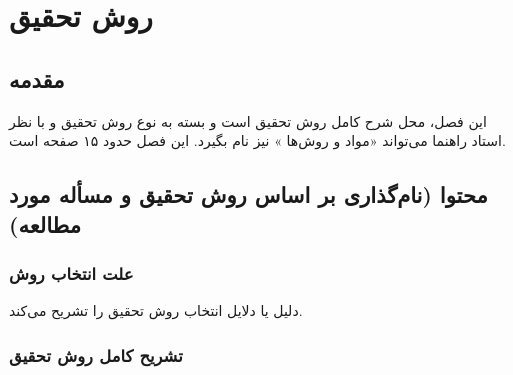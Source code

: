 \chapter{روش تحقیق}
\thispagestyle{empty} 
\section{مقدمه} 
این فصل، محل شرح كامل روش تحقيق است و بسته به نوع روش تحقيق و با نظر استاد راهنما می‌تواند «مواد و روش‌ها%
»
نیز نام بگیرد. اين فصل حدود ۱۵ صفحه است.

\section{محتوا (نام‌گذاری بر اساس روش تحقیق و مسأله مورد مطالعه)}
\subsection{علت انتخاب روش}
دلیل یا دلایل انتخاب روش تحقیق را تشریح می‌کند.

\subsection{تشریح کامل روش تحقیق}
